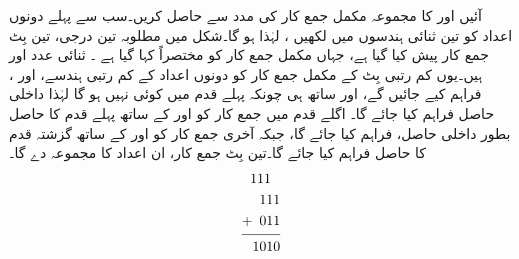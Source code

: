 آئیں  اور  کا مجموعہ مکمل جمع کار کی مدد سے حاصل کریں۔سب سے پہلے دونوں اعداد کو تین ثنائی ہندسوں میں لکھیں ، لہٰذا  ہو گا۔شکل  میں مطلوبہ تین درجی، تین بِٹ جمع کار پیش کیا گیا ہے، جہاں مکمل جمع کار کو مختصراً  کہا گیا ہے ۔ ثنائی عدد  اور  ہیں۔یوں کم رتبی بِٹ کے مکمل جمع کار کو دونوں اعداد کے کم رتبی ہندسے،  اور ، فراہم کیے جائیں گے، اور ساتھ ہی چونکہ پہلے قدم میں کوئی  نہیں ہو گا لہٰذا داخلی حاصل  فراہم کیا جائے گا۔ اگلے قدم میں جمع کار کو  اور  کے ساتھ پہلے قدم کا حاصل  بطور داخلی حاصل، فراہم کیا جائے گا، جبکہ آخری جمع کار کو  اور  کے ساتھ گزشتہ قدم کا حاصل  فراہم کیا جائے گا۔تین بِٹ جمع کار، ان اعداد کا مجموعہ  دے گا۔
\begin{align*}
\begin{split}
111\phantom{1\,}&\\
\phantom{1}111&\\
+\phantom{1}011&\\
\noalign{\smallskip}\hline\noalign{\smallskip}
1010&
\end{split}
\end{align*}
%
